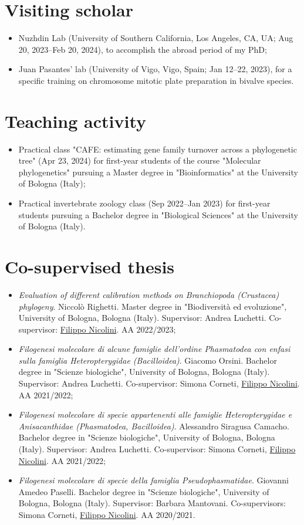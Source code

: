 \section*{Visiting scholar}
\begin{itemize}
    \item Nuzhdin Lab (University of Southern California, Los Angeles, CA, UA; Aug 20, 2023--Feb 20, 2024), to accomplish the abroad period of my PhD;
    \item Juan Pasantes’ lab (University of Vigo, Vigo, Spain; Jan 12--22, 2023), for a specific training on chromosome mitotic plate preparation in bivalve species.
\end{itemize}

\section*{Teaching activity}
\begin{itemize}
    \item Practical class "CAFE: estimating gene family turnover across a phylogenetic tree" (Apr 23, 2024) for first-year students of the course "Molecular phylogenetics" pursuing a Master degree in "Bioinformatics" at the University of Bologna (Italy);
    \item Practical invertebrate zoology class (Sep 2022--Jan 2023) for first-year students pursuing a Bachelor degree in "Biological Sciences" at the University of Bologna (Italy).
\end{itemize}

\section*{Co-supervised thesis}
\begin{itemize}
    \item \textit{Evaluation of different calibration methods on Branchiopoda (Crustacea) phylogeny}. Niccolò Righetti. Master degree in "Biodiversità ed evoluzione", University of Bologna, Bologna (Italy). Supervisor: Andrea Luchetti. Co-supervisor: \underline{Filippo Nicolini}. AA 2022/2023;
    \item \textit{Filogenesi molecolare di alcune famiglie dell’ordine Phasmatodea con enfasi sulla famiglia Heteropterygidae (Bacilloidea)}. Giacomo Orsini. Bachelor degree in "Scienze biologiche", University of Bologna, Bologna (Italy). Supervisor: Andrea Luchetti. Co-supervisor: Simona Corneti, \underline{Filippo Nicolini}. AA 2021/2022;
    \item \textit{Filogenesi molecolare di specie appartenenti alle famiglie Heteropterygidae e Anisacanthidae (Phasmatodea, Bacilloidea)}. Alessandro Siragusa Camacho. Bachelor degree in "Scienze biologiche", University of Bologna, Bologna (Italy). Supervisor: Andrea Luchetti. Co-supervisor: Simona Corneti, \underline{Filippo Nicolini}. AA 2021/2022;
    \item \textit{Filogenesi molecolare di specie della famiglia Pseudophasmatidae}. Giovanni Amedeo Paselli. Bachelor degree in "Scienze biologiche", University of Bologna, Bologna (Italy). Supervisor: Barbara Mantovani. Co-supervisors: Simona Corneti, \underline{Filippo Nicolini}. AA 2020/2021.
\end{itemize}

